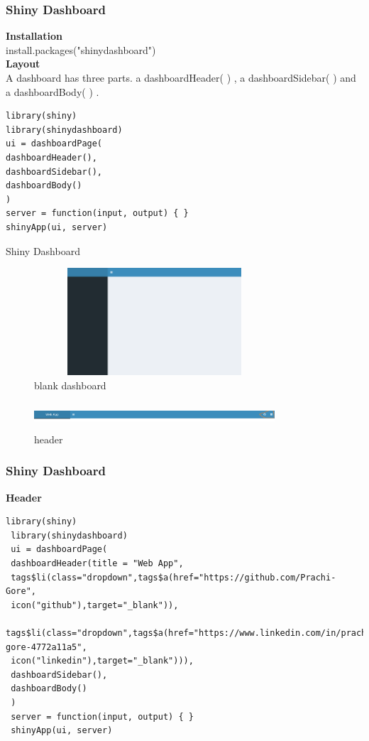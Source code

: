 \documentclass[aspectratio=169,serif,professionalfont]{beamer}
\begin{document}
\begin{frame}[fragile]
  \frametitle{Shiny Dashboard}
  \textbf{Installation}\\
install.packages("shinydashboard")\\
\textbf{Layout}\\
A dashboard has three parts. a dashboardHeader( ) , a dashboardSidebar( ) and a dashboardBody( ) .\\
\begin{verbatim}
library(shiny)
library(shinydashboard)
ui = dashboardPage(
dashboardHeader(),
dashboardSidebar(),
dashboardBody()
)
server = function(input, output) { }
shinyApp(ui, server)    
\end{verbatim}
\end{frame}

\begin{frame}{Shiny Dashboard}
    \begin{figure}[htbp]
    \centering
    \includegraphics[width=0.8\textwidth,height=4cm]{blank_dashboard.png}
    \caption{blank dashboard}
    \label{fig:image_label5}
   \end{figure}
   \begin{figure}[htbp]
    \centering
    \includegraphics[width=0.8\textwidth,height=1cm]{header.png}
    \caption{header}
    \label{fig:image_label6}
   \end{figure}
\end{frame}

\begin{frame}[fragile]
  \frametitle{Shiny Dashboard}
  \textbf{Header}\\
\begin{verbatim}
library(shiny)
 library(shinydashboard)
 ui = dashboardPage(
 dashboardHeader(title = "Web App",
 tags$li(class="dropdown",tags$a(href="https://github.com/Prachi-Gore",
 icon("github"),target="_blank")),
 tags$li(class="dropdown",tags$a(href="https://www.linkedin.com/in/prachi-gore-4772a11a5",
 icon("linkedin"),target="_blank"))),
 dashboardSidebar(),
 dashboardBody()
 )
 server = function(input, output) { }
 shinyApp(ui, server)   
\end{verbatim}
\end{frame}
\end{document}
